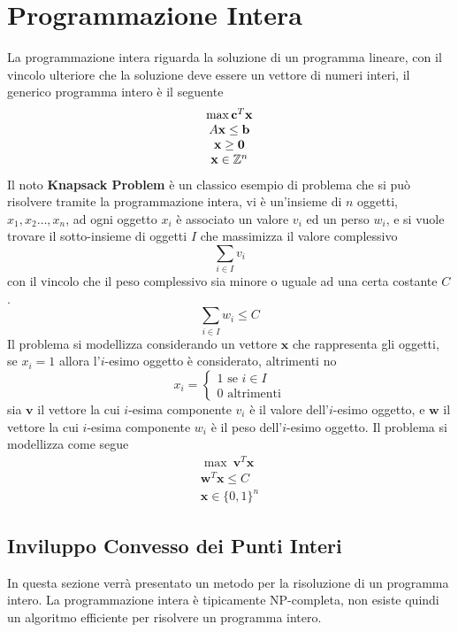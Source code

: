 \documentclass[10pt, letterpaper]{report}
\newcommand{\bb}{{\mathbf{b}}}
\newcommand{\bc}{{\mathbf{c}}}
\newcommand{\x}{{\mathbf{x}}}
\begin{document}
\chapter{Programmazione Intera}
La programmazione intera riguarda la soluzione di un programma lineare, con il vincolo ulteriore che la soluzione deve essere un vettore di numeri interi, il generico programma intero è il seguente\begin{equation}
    \begin{matrix}
        \max \bc^T\x\\ 
        A\x\le\bb\\ 
        \x\ge\mathbf 0\\ 
        \x\in\Z^n
    \end{matrix}
\end{equation}
Il noto \textbf{Knapsack Problem} è un classico esempio di problema che si può risolvere tramite la programmazione intera, vi è un'insieme di $n$ oggetti, $x_1,x_2\dots,x_n$, ad ogni oggetto $x_i$ è associato un valore $v_i$ ed un perso $w_i$, e si vuole trovare il sotto-insieme di oggetti $I$ che massimizza il valore complessivo$$ \sum_{i\in I}v_i$$ con il vincolo che il peso complessivo sia minore o uguale ad una certa costante $C$.
$$ \sum_{i\in I}w_i\le C$$
Il problema si modellizza considerando un vettore $\x$ che rappresenta gli oggetti, se $x_i=1$ allora l'$i$-esimo oggetto è considerato, altrimenti no$$ x_i=\begin{cases}
    1\text{ se }i\in I\\
    0\text{ altrimenti}
\end{cases}$$
sia $\mathbf v$ il vettore la cui $i$-esima componente $v_i$ è il valore dell'$i$-esimo oggetto, e $\mathbf w$ il vettore la cui $i$-esima componente $w_i$ è il peso dell'$i$-esimo oggetto. Il problema si modellizza come segue\begin{eqnarray*}
    \max \ \mathbf v^T\x\\ 
    \mathbf w^T\x\le C\\ 
    \x \in \{0,1\}^n
\end{eqnarray*}
\section{Inviluppo Convesso dei Punti Interi}
In questa sezione verrà presentato un metodo per la risoluzione di un programma intero. La programmazione intera è tipicamente NP-completa, non esiste quindi un algoritmo efficiente per risolvere un programma intero.\bigskip 
\end{document}
